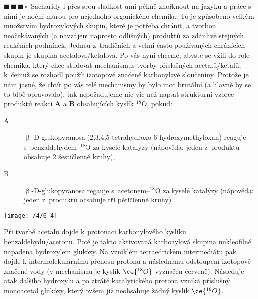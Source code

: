 \documentclass{book}
\newcommand{\tri}{$\blacksquare \, \blacksquare \, \blacksquare \, \square \; \; $}
\renewenvironment{quotation}{\par}{\par} %
\begin{document}
\newpage %
\begin{quotation}
\tri Sacharidy i přes svou sladkost umí pěkně zhořknout na jazyku a práce
s nimi je noční můrou pro nejednoho organického chemika. To je způsobeno
velkým množstvím hydroxylových skupin, které je potřeba chránit, a
tvorbou neočekávaných (a navzájem naprosto odlišných) produktů za
zdánlivě stejných reakčních podmínek. Jednou z~tradičních a velmi
často používaných chránících skupin je skupina acetalová/ketalová.
Po vás nyní chceme, abyste se vžili do role chemika, který chce studovat
mechanismus tvorby příslušných ace\-ta\-lů/ke\-ta\-lů, k~čemuž
se rozhodl použít izotopově značené karbonylové sloučeniny. Protože
je nám jasné, že chtít po vás celé mechanismy by bylo moc brutální
(a hlavně by se to blbě opravovalo), tak nepožadujeme nic víc než
napsat strukturní vzorce produktů reakcí \textbf{A} a \textbf{B} obsahujících kyslík
$\mathrm{^{18}O}$, pokud: 
\begin{description}
\item [{A}] $\upbeta$-D-glukopyranosa (2,3,4,5-tetrahydroxo-6-hydroxymethyloxan)
reaguje s~benzaldehydem--$\mathrm{^{18}O}$ za kyselé katalýzy (nápověda:
jeden z~produktů obsahuje 2 šestičlenné kruhy),
\item [{B}] $\upbeta$-D-glukopyranosa regauje s~acetonem--$\mathrm{^{18}O}$
za kyselé katalýzy (nápověda: jeden z~produktů obsahuje tři pětičlenné
kruhy).
\end{description}
\end{quotation} \dotfill \par 
\noindent \begin{center}

\texttt{[image: /4/6-4]}

\par\end{center}

Při tvorbě acetalu dojde k~protonaci karbonylového kyslíku benzaldehydu/aceto\-nu.
Poté je takto aktivovaná karbonylová skupina nukleofilně napadena
hydroxylem glukózy. Na vzniklém tetraedrickém intermediátu pak dojde
k intermolekulárnímu přenosu protonu a následnému odstoupení izotopově
značené vody (v mechanismu je kyslík $\ce{^{18}O}$ vyznačen červeně).
Následuje atak dalšího hydroxylu a po ztrátě katalytického protonu
vzniká příslušný monoacetal glukózy, který ovšem již neobsahuje žádný kyslík $\ce{^{18}O}$.
\end{document}
